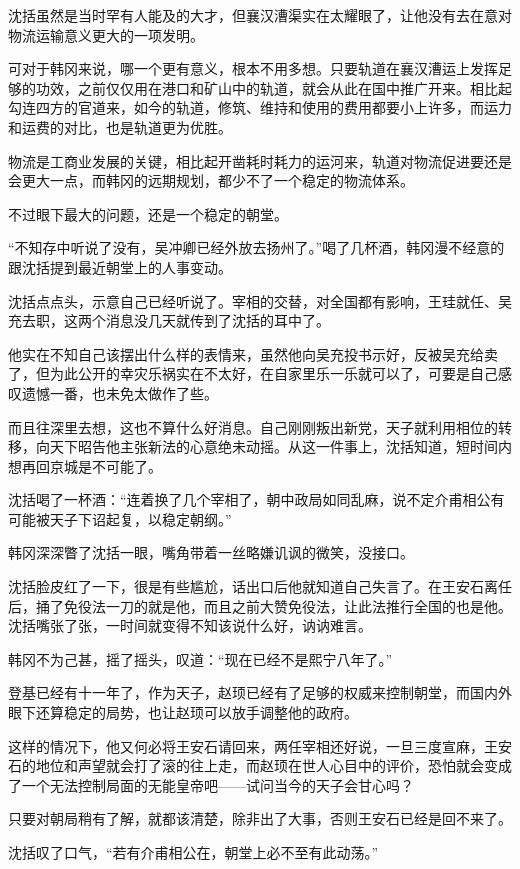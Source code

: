 沈括虽然是当时罕有人能及的大才，但襄汉漕渠实在太耀眼了，让他没有去在意对物流运输意义更大的一项发明。

可对于韩冈来说，哪一个更有意义，根本不用多想。只要轨道在襄汉漕运上发挥足够的功效，之前仅仅用在港口和矿山中的轨道，就会从此在国中推广开来。相比起勾连四方的官道来，如今的轨道，修筑、维持和使用的费用都要小上许多，而运力和运费的对比，也是轨道更为优胜。

物流是工商业发展的关键，相比起开凿耗时耗力的运河来，轨道对物流促进要还是会更大一点，而韩冈的远期规划，都少不了一个稳定的物流体系。

不过眼下最大的问题，还是一个稳定的朝堂。

“不知存中听说了没有，吴冲卿已经外放去扬州了。”喝了几杯酒，韩冈漫不经意的跟沈括提到最近朝堂上的人事变动。

沈括点点头，示意自己已经听说了。宰相的交替，对全国都有影响，王珪就任、吴充去职，这两个消息没几天就传到了沈括的耳中了。

他实在不知自己该摆出什么样的表情来，虽然他向吴充投书示好，反被吴充给卖了，但为此公开的幸灾乐祸实在不太好，在自家里乐一乐就可以了，可要是自己感叹遗憾一番，也未免太做作了些。

而且往深里去想，这也不算什么好消息。自己刚刚叛出新党，天子就利用相位的转移，向天下昭告他主张新法的心意绝未动摇。从这一件事上，沈括知道，短时间内想再回京城是不可能了。

沈括喝了一杯酒：“连着换了几个宰相了，朝中政局如同乱麻，说不定介甫相公有可能被天子下诏起复，以稳定朝纲。”

韩冈深深瞥了沈括一眼，嘴角带着一丝略嫌讥讽的微笑，没接口。

沈括脸皮红了一下，很是有些尴尬，话出口后他就知道自己失言了。在王安石离任后，捅了免役法一刀的就是他，而且之前大赞免役法，让此法推行全国的也是他。沈括嘴张了张，一时间就变得不知该说什么好，讷讷难言。

韩冈不为己甚，摇了摇头，叹道：“现在已经不是熙宁八年了。”

登基已经有十一年了，作为天子，赵顼已经有了足够的权威来控制朝堂，而国内外眼下还算稳定的局势，也让赵顼可以放手调整他的政府。

这样的情况下，他又何必将王安石请回来，两任宰相还好说，一旦三度宣麻，王安石的地位和声望就会打了滚的往上走，而赵顼在世人心目中的评价，恐怕就会变成了一个无法控制局面的无能皇帝吧——试问当今的天子会甘心吗？

只要对朝局稍有了解，就都该清楚，除非出了大事，否则王安石已经是回不来了。

沈括叹了口气，“若有介甫相公在，朝堂上必不至有此动荡。”

